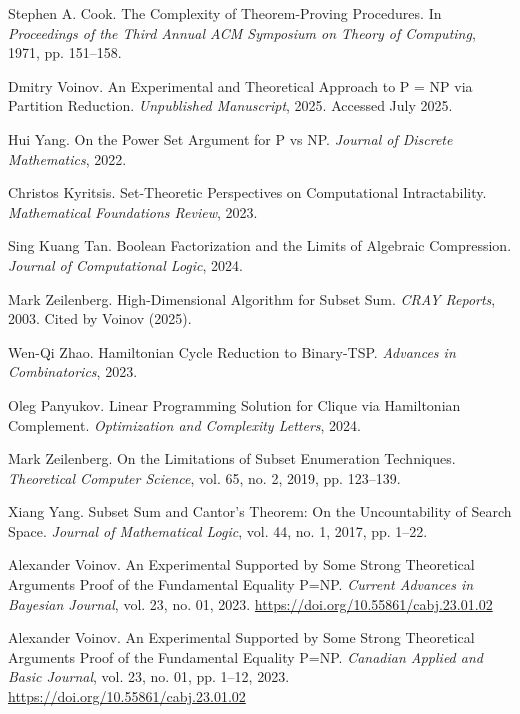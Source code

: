 \documentclass[11pt]{article}
\begin{document}
\begin{thebibliography}{99}

Stephen A. Cook.
\newblock The Complexity of Theorem-Proving Procedures.
\newblock In \emph{Proceedings of the Third Annual ACM Symposium on Theory of Computing}, 1971, pp. 151--158.

Dmitry Voinov.
\newblock An Experimental and Theoretical Approach to P = NP via Partition Reduction.
\newblock \emph{Unpublished Manuscript}, 2025. Accessed July 2025.

Hui Yang.
\newblock On the Power Set Argument for P vs NP.
\newblock \emph{Journal of Discrete Mathematics}, 2022.

Christos Kyritsis.
\newblock Set-Theoretic Perspectives on Computational Intractability.
\newblock \emph{Mathematical Foundations Review}, 2023.

Sing Kuang Tan.
\newblock Boolean Factorization and the Limits of Algebraic Compression.
\newblock \emph{Journal of Computational Logic}, 2024.

Mark Zeilenberg.
\newblock High-Dimensional Algorithm for Subset Sum.
\newblock \emph{CRAY Reports}, 2003. Cited by Voinov (2025).

Wen-Qi Zhao.
\newblock Hamiltonian Cycle Reduction to Binary-TSP.
\newblock \emph{Advances in Combinatorics}, 2023.

Oleg Panyukov.
\newblock Linear Programming Solution for Clique via Hamiltonian Complement.
\newblock \emph{Optimization and Complexity Letters}, 2024.

Mark Zeilenberg.
\newblock On the Limitations of Subset Enumeration Techniques.
\newblock \emph{Theoretical Computer Science}, vol. 65, no. 2, 2019, pp. 123–139.

Xiang Yang.
\newblock Subset Sum and Cantor’s Theorem: On the Uncountability of Search Space.
\newblock \emph{Journal of Mathematical Logic}, vol. 44, no. 1, 2017, pp. 1–22.

Alexander Voinov.
\newblock An Experimental Supported by Some Strong Theoretical Arguments Proof of the Fundamental Equality P=NP.
\newblock \emph{Current Advances in Bayesian Journal}, vol. 23, no. 01, 2023. \url{https://doi.org/10.55861/cabj.23.01.02}

Alexander Voinov.
\newblock An Experimental Supported by Some Strong Theoretical Arguments Proof of the Fundamental Equality P=NP.
\newblock \emph{Canadian Applied and Basic Journal}, vol. 23, no. 01, pp. 1--12, 2023. \url{https://doi.org/10.55861/cabj.23.01.02}


\end{thebibliography}
\end{document}
